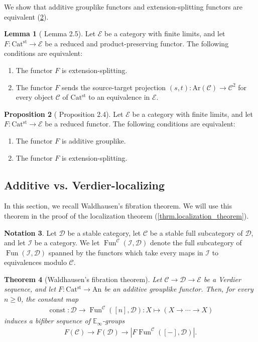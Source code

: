 \documentclass[a4paper,dvipdfmx,11pt,reqno]{amsart}
\DeclareMathOperator{\const}{const}
\DeclareMathOperator{\Fun}{Fun}
\newcommand{\C}{\mathcal{C}}
\newcommand{\D}{\mathcal{D}}
\newcommand{\E}{\mathcal{E}}
\newcommand{\I}{\mathcal{I}}
\newcommand{\An}{\mathrm{An}}
\newcommand{\Catst}{\mathrm{Cat^{st}}}
\newcommand{\Ar}{\mathrm{Ar}}
\newcommand{\Einf}{\mathbb{E}_{\infty}}
\newtheorem{theorem}{Theorem}[section]
\theoremstyle{definition}
\newtheorem{lemma}[theorem]{Lemma}
\newtheorem{notation}[theorem]{Notation}
\newtheorem{proposition}[theorem]{Proposition}
\begin{document}
We show that additive grouplike functors and extension-splitting functors are equivalent (\cref{HLS23.prop.2.4}). 

\begin{lemma}[\cite{HLS23} Lemma 2.5] \label{HLS23.lem.2.5}
  Let $\E$ be a category with finite limits, and let $F : \Catst \to \E$ be a reduced and product-preserving functor.
  The following conditions are equivalent:
  \begin{enumerate}
    \item The functor $F$ is extension-splitting.
    \item The functor $F$ sends the source-target projection $(s,t) : \Ar(\C) \to \C^2$ for every object $\C$ of $\Catst$ to an equivalence in $\E$.
  \end{enumerate}
\end{lemma}

\begin{proposition}[\cite{HLS23} Proposition 2.4] \label{HLS23.prop.2.4}
  Let $\E$ be a category with finite limits, and let $F : \Catst \to \E$ be a reduced functor.
  The following conditions are equivalent:
  \begin{enumerate}
    \item The functor $F$ is additive grouplike.
    \item The functor $F$ is extension-splitting.
  \end{enumerate}
\end{proposition}

\subsection{Additive vs. Verdier-localizing}

In this section, we recall Waldhausen's fibration theorem.
We will use this theorem in the proof of the localization theorem (\cref{thrm.localization_theorem}).

\begin{notation}
  Let $\D$ be a stable category, let $\C$ be a stable full subcategory of $\D$, and let $\I$ be a category.
  We let $\Fun^{\C}(\I,\D)$ denote the full subcategory of $\Fun(\I,\D)$ spanned by the functors which take every maps in $\I$ to equivalences modulo $\C$.
\end{notation}

\begin{theorem}[Waldhausen's fibration theorem] \label{thrm.Waldhausen_fibration_theorem}
  Let $\C \to \D \to \E$ be a Verdier sequence, and let $F : \Catst \to \An$ be an additive grouplike functor.
  Then, for every $n \geq 0$, the constant map 
  \begin{align*}
    \const : \D \to \Fun^{\C}([n],\D) : X \mapsto (X \to \cdots \to X)
  \end{align*}
  induces a bifiber sequence of $\Einf$-groups 
  \begin{align*}
    F(\C) \to F(\D) \to |F\Fun^{\C}([-],\D)|.
  \end{align*}
\end{theorem}
\end{document}
